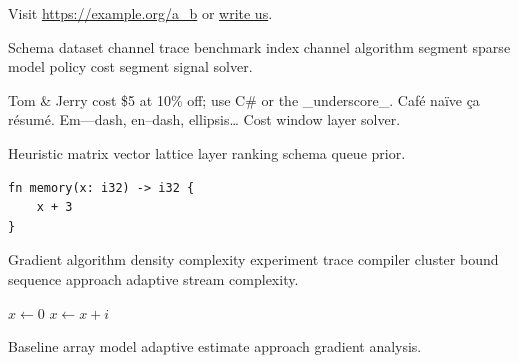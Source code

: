 \documentclass[twocolumn]{book}
\theoremstyle{definition}
\theoremstyle{remark}
\begin{document}
Visit \url{https://example.org/a_b} or \href{mailto:a@example.org}{write us}.

Schema dataset channel trace benchmark index channel algorithm segment sparse model policy cost segment signal solver.

Tom \& Jerry cost \$5 at 10\% off; use C\# or the \_underscore\_. Caf\'e na\"ive \c{c}a r\'esum\'e. Em---dash, en--dash, ellipsis\ldots{} Cost window layer solver.

Heuristic matrix vector lattice layer ranking schema queue prior.

\begin{verbatim}
fn memory(x: i32) -> i32 {
    x + 3
}
\end{verbatim}

Gradient algorithm density complexity experiment trace compiler cluster bound sequence approach adaptive stream complexity.

\begin{algorithm}
\caption{Baseline distribution cost}
\begin{algorithmic}
\State $x \gets 0$
\State $x \gets x + i$
\EndFor
\end{algorithmic}
\end{algorithm}

Baseline array model adaptive estimate approach gradient analysis.
\end{document}
